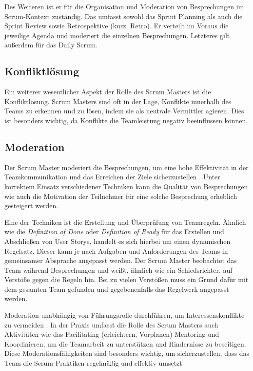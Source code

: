 \documentclass[5pt, final]{beamer}
\begin{document}
\begin{frame}[t]
\begin{multicols}{3}
			Des Weiteren ist er für die Organisation und Moderation von Besprechungen im Scrum-Kontext zuständig.
			Das umfasst sowohl das Sprint Planning als auch die Sprint Review sowie Retrospektive (kurz: Retro).
			Er verteilt im Voraus die jeweilige Agenda und moderiert die einzelnen Besprechungen.
			Letzteres gilt außerdem für das Daily Scrum.
			
			\subsection{Konfliktlösung}
			
			Ein weiterer wesentlicher Aspekt der Rolle des Scrum Masters ist die Konfliktlösung. Scrum Masters sind oft in der Lage, Konflikte innerhalb des Teams zu erkennen und zu lösen, indem sie als neutrale Vermittler agieren. Dies ist besonders wichtig, da Konflikte die Teamleistung negativ beeinflussen können.\cite{Noll17}
			
			\subsection{Moderation}
			
			Der Scrum Master moderiert die Besprechungen, um eine hohe Effektivität in der Teamkommunikation und das Erreichen der Ziele sicherzustellen \cite{vantighem24}.
			Unter korrektem Einsatz verschiedener Techniken kann die Qualität von Besprechungen wie auch die Motivation der Teilnehmer für eine solche Besprechung erheblich gesteigert werden.
			
			Eine der Techniken ist die Erstellung und Überprüfung von Teamregeln.
			Ähnlich wie die \textit{Definition of Done} oder \textit{Definition of Ready} für das Erstellen und Abschließen von User Storys, handelt es sich hierbei um einen dynamischen Regelsatz.
			Dieser kann je nach Aufgaben und Anforderungen des Teams in gemeinsamer Absprache angepasst werden.
			Der Scrum Master beobachtet das Team während Besprechungen und weißt, ähnlich wie ein Schiedsrichter, auf Verstöße gegen die Regeln hin.
			Bei zu vielen Verstößen muss ein Grund dafür mit dem gesamten Team gefunden und gegebenenfalls das Regelwerk angepasst werden.
			
			Moderation unabhängig von Führungsrolle durchführen, um Interessenskonflikte zu vermeiden \cite[S. 23]{malten24}.
			In der Praxis umfasst die Rolle des Scrum Masters auch Aktivitäten wie das Facilitating (erleichtern, Vorplanen) Mentoring und Koordinieren, um die Teamarbeit zu unterstützen und Hindernisse zu beseitigen. Diese Moderationsfähigkeiten sind besonders wichtig, um sicherzustellen, dass das Team die Scrum-Praktiken regelmäßig und effektiv umsetzt \cite{Shastri21}
			

\end{multicols}
\end{frame}
\end{document}
